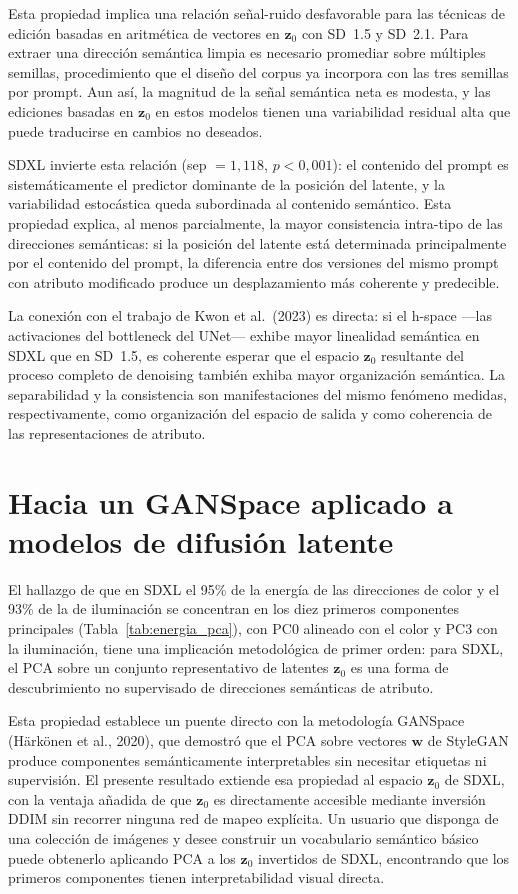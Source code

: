 \documentclass[12pt, a4paper, twoside]{book}
\newcommand{\z}{\mathbf{z}}
\begin{document}
Esta propiedad implica una relación señal-ruido desfavorable para las técnicas de edición basadas en aritmética de vectores en $\z_0$ con SD~1.5 y SD~2.1. Para extraer una dirección semántica limpia es necesario promediar sobre múltiples semillas, procedimiento que el diseño del corpus ya incorpora con las tres semillas por prompt. Aun así, la magnitud de la señal semántica neta es modesta, y las ediciones basadas en $\z_0$ en estos modelos tienen una variabilidad residual alta que puede traducirse en cambios no deseados.

SDXL invierte esta relación (sep $= 1{,}118$, $p < 0{,}001$): el contenido del prompt es sistemáticamente el predictor dominante de la posición del latente, y la variabilidad estocástica queda subordinada al contenido semántico. Esta propiedad explica, al menos parcialmente, la mayor consistencia intra-tipo de las direcciones semánticas: si la posición del latente está determinada principalmente por el contenido del prompt, la diferencia entre dos versiones del mismo prompt con atributo modificado produce un desplazamiento más coherente y predecible.

La conexión con el trabajo de Kwon et al.\ (2023) es directa: si el h-space ---las activaciones del bottleneck del UNet--- exhibe mayor linealidad semántica en SDXL que en SD~1.5, es coherente esperar que el espacio $\z_0$ resultante del proceso completo de denoising también exhiba mayor organización semántica. La separabilidad y la consistencia son manifestaciones del mismo fenómeno medidas, respectivamente, como organización del espacio de salida y como coherencia de las representaciones de atributo.

\section{Hacia un GANSpace aplicado a modelos de difusión latente}
\label{sec:dis:ganspace}

El hallazgo de que en SDXL el 95\% de la energía de las direcciones de color y el 93\% de la de iluminación se concentran en los diez primeros componentes principales (Tabla~\ref{tab:energia_pca}), con PC0 alineado con el color y PC3 con la iluminación, tiene una implicación metodológica de primer orden: para SDXL, el PCA sobre un conjunto representativo de latentes $\z_0$ es una forma de descubrimiento no supervisado de direcciones semánticas de atributo.

Esta propiedad establece un puente directo con la metodología GANSpace (Härkönen et al., 2020), que demostró que el PCA sobre vectores $\mathbf{w}$ de StyleGAN produce componentes semánticamente interpretables sin necesitar etiquetas ni supervisión. El presente resultado extiende esa propiedad al espacio $\z_0$ de SDXL, con la ventaja añadida de que $\z_0$ es directamente accesible mediante inversión DDIM sin recorrer ninguna red de mapeo explícita. Un usuario que disponga de una colección de imágenes y desee construir un vocabulario semántico básico puede obtenerlo aplicando PCA a los $\z_0$ invertidos de SDXL, encontrando que los primeros componentes tienen interpretabilidad visual directa.
\end{document}
